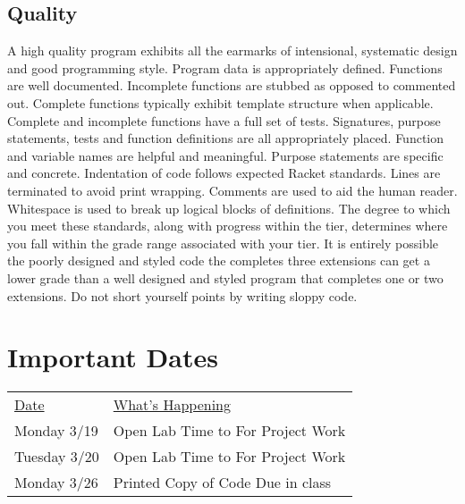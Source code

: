 \documentclass[nobib]{tufte-handout}
\begin{document}
  \subsection*{Quality}

  A high quality program exhibits all the earmarks of intensional, systematic design and good programming style. Program data is appropriately defined. Functions are well documented. Incomplete functions are stubbed as opposed to commented out. Complete functions typically exhibit template structure when applicable. Complete and incomplete functions have a full set of tests. Signatures, purpose statements, tests and function definitions are all appropriately placed.  Function and variable names are helpful and meaningful. Purpose statements are specific and concrete. Indentation of code follows expected Racket standards. Lines are terminated to avoid print wrapping. Comments are used to aid the human reader. Whitespace is used to break up logical blocks of definitions. The degree to which you meet these standards, along with progress within the tier, determines where you fall within the grade range associated with your tier. It is entirely possible the poorly designed and styled code the completes three extensions can get a lower grade than a well designed and styled program that completes one or two extensions. Do not short yourself points by writing sloppy code.


  \section*{Important Dates}

  \begin{tabular}{ll}
    \underline{Date} & \underline{What's Happening} \\
     Monday 3/19 & Open Lab Time to For Project Work \\
     Tuesday 3/20 & Open Lab Time to For Project Work \\
     Monday 3/26 & Printed Copy of Code Due in class
  \end{tabular}
\end{document}
